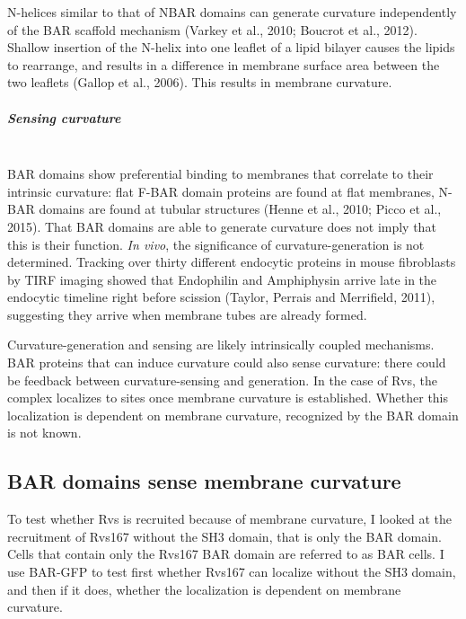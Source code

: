 N-helices similar to that of NBAR domains can generate curvature independently of the BAR scaffold mechanism (Varkey et al., 2010; Boucrot et al., 2012). Shallow insertion of the N-helix into one leaflet of a lipid bilayer causes the lipids to rearrange, and results in a difference in membrane surface area between the two leaflets (Gallop et al., 2006). This results in membrane curvature. 


	
	\vspace{5mm}
\newpage	
				\subparagraph{Sensing curvature }
								\mbox{}\\
BAR domains show preferential binding to membranes that correlate to their intrinsic curvature: flat F-BAR domain proteins are found at flat membranes, N-BAR domains are found at tubular structures (Henne et al., 2010; Picco et al., 2015). That BAR domains are able to generate curvature does not imply that this is their function. \textit{In vivo}, the significance of curvature-generation is not determined. Tracking over thirty different endocytic proteins in mouse fibroblasts by TIRF imaging showed that Endophilin and Amphiphysin arrive late in the endocytic timeline right before scission (Taylor, Perrais and Merrifield, 2011), suggesting they arrive when membrane tubes are already formed. 


	\vspace{5mm}
Curvature-generation and sensing are likely intrinsically coupled mechanisms. BAR proteins that can induce curvature could also sense curvature: there could be feedback between curvature-sensing and generation. In the case of Rvs, the complex localizes to sites once membrane curvature is established. Whether this localization is dependent on membrane curvature, recognized by the BAR domain is not known. 



	\subsection{BAR domains sense membrane curvature}
\label{sub_curvature}


To test whether Rvs is recruited because of membrane curvature, I looked at the recruitment of Rvs167 without the SH3 domain, that is only the BAR domain. Cells that contain only the Rvs167 BAR domain are referred to as BAR cells. I use BAR-GFP to test first whether Rvs167 can localize without the SH3 domain, and then if it does, whether the localization is dependent on membrane curvature.

